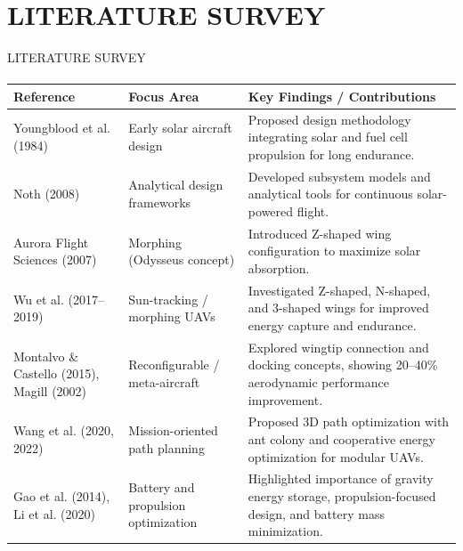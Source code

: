 \documentclass{beamer}
\begin{document}
\section{LITERATURE SURVEY}
\begin{frame}{LITERATURE SURVEY}
    \framesubtitle{}
    \begin{table}[]
        \centering
        \scriptsize %
        \begin{tabular}{|p{2.8cm}|p{2.8cm}|p{4.8cm}|}
            \hline
            \textbf{Reference} & \textbf{Focus Area} & \textbf{Key Findings / Contributions} \\ \hline
            Youngblood et al. (1984) & Early solar aircraft design & Proposed design methodology integrating solar and fuel cell propulsion for long endurance. \\ \hline
            Noth (2008) & Analytical design frameworks & Developed subsystem models and analytical tools for continuous solar-powered flight. \\ \hline
            Aurora Flight Sciences (2007) & Morphing (Odysseus concept) & Introduced Z-shaped wing configuration to maximize solar absorption. \\ \hline
            Wu et al. (2017–2019) & Sun-tracking / morphing UAVs & Investigated Z-shaped, N-shaped, and 3-shaped wings for improved energy capture and endurance. \\ \hline
            Montalvo \& Castello (2015), Magill (2002) & Reconfigurable / meta-aircraft & Explored wingtip connection and docking concepts, showing 20–40\% aerodynamic performance improvement. \\ \hline
            Wang et al. (2020, 2022) & Mission-oriented path planning & Proposed 3D path optimization with ant colony and cooperative energy optimization for modular UAVs. \\ \hline
            Gao et al. (2014), Li et al. (2020) & Battery and propulsion optimization & Highlighted importance of gravity energy storage, propulsion-focused design, and battery mass minimization. \\ \hline
        \end{tabular}
    \end{table}
\end{frame}

	
\end{document}
